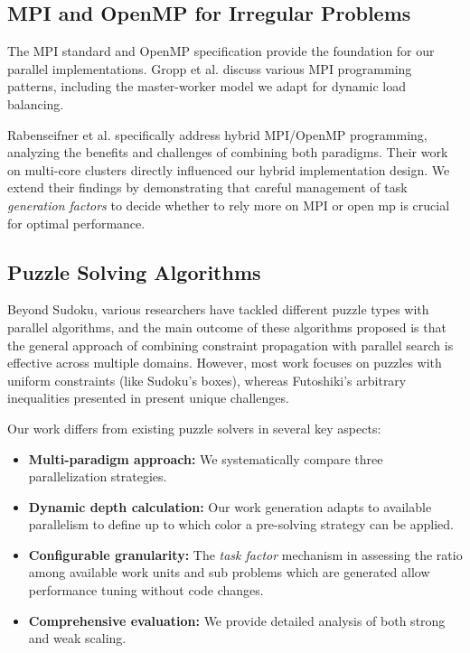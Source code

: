 \subsection{MPI and OpenMP for Irregular Problems}
\label{subsec:mpi_omp_irregular_problems}
The MPI standard \cite{MPIForum2021} and OpenMP specification \cite{OpenMP2020} provide the foundation for our parallel implementations. Gropp et al. \cite{Gropp1999} discuss various MPI programming patterns, including the master-worker model we adapt for dynamic load balancing.

Rabenseifner et al. \cite{Rabenseifner2009} specifically address hybrid MPI/OpenMP programming, analyzing the benefits and challenges of combining both paradigms. Their work on multi-core clusters directly influenced our hybrid implementation design. We extend their findings by demonstrating that careful management of task \textit{generation factors} to decide whether to rely more on MPI or open mp is crucial for optimal performance.

\subsection{Puzzle Solving Algorithms}
\label{subsec:puzzle_solving_algorithms}
Beyond Sudoku, various researchers have tackled different puzzle types with parallel algorithms, and the main outcome of these algorithms proposed is that the general approach of combining constraint propagation with parallel search is effective across multiple domains. However, most work focuses on puzzles with uniform constraints (like Sudoku's boxes), whereas Futoshiki's arbitrary inequalities presented in  present unique challenges.

Our work differs from existing puzzle solvers in several key aspects:
\begin{itemize}
    \item \textbf{Multi-paradigm approach:} We systematically compare three parallelization strategies.
    \item \textbf{Dynamic depth calculation:} Our work generation adapts to available parallelism to define up to which color a pre-solving strategy can be applied.
    \item \textbf{Configurable granularity:} The \textit{task factor} mechanism in assessing the ratio among available work units and sub problems which are generated allow performance tuning without code changes.
    \item \textbf{Comprehensive evaluation:} We provide detailed analysis of both strong and weak scaling.
\end{itemize}


